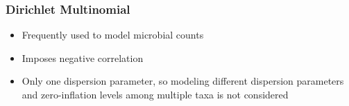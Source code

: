 \documentclass{beamer}
\begin{document}
%


\begin{frame}
\frametitle{Dirichlet Multinomial}
\begin{itemize}
  \item Frequently used to model microbial counts
  \item Imposes negative correlation
  \item Only one dispersion parameter, so modeling different dispersion parameters and zero-inflation levels among multiple taxa is not considered
\end{itemize}
\end{frame}

\end{document}
